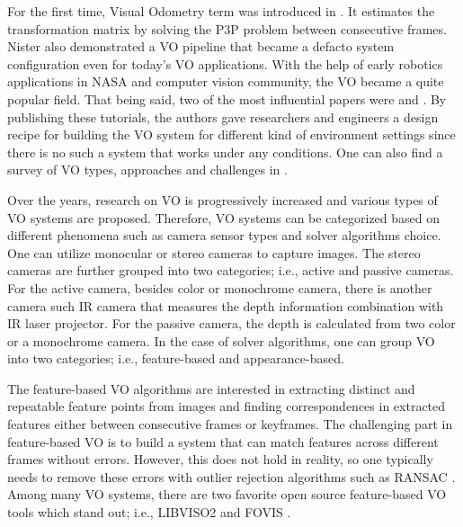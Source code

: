 \documentclass[a4paper]{report}
\numberwithin{figure}{section}
\begin{document}
For the first time, Visual Odometry term was introduced in 
\parencite{Nister2004}. 
It estimates the transformation matrix by solving the P3P problem between 
consecutive frames. Nister also demonstrated a VO pipeline that became a 
defacto system configuration even for today's VO applications. With the help 
of early robotics applications in NASA and computer vision community, the VO 
became a quite popular field. That being said, two of the most influential 
papers were \parencite{Fraundorfer2012} and \parencite{Scaramuzza2011}. By 
publishing 
these tutorials, the authors gave researchers and engineers a design recipe 
for building the VO system for different kind of environment settings since 
there is no such a system that works under any conditions. One can also find a 
survey of VO types, approaches and challenges in \parencite{Aqel2016}.

Over the years, research on VO is progressively increased and various types of 
VO systems are proposed. Therefore, VO systems can be categorized based on 
different phenomena such as camera sensor types and solver algorithms choice. 
One can utilize monocular or stereo cameras to capture images. The stereo 
cameras are further grouped into two categories; i.e., active and passive 
cameras. For the active camera, besides color or monochrome camera, there is 
another camera such IR camera that measures the depth information combination 
with IR laser projector. For the passive camera, the depth is calculated from 
two color or a monochrome camera. In the case of solver algorithms, one can 
group VO into two categories; i.e., feature-based and appearance-based.

The feature-based VO algorithms are interested in extracting distinct and 
repeatable feature points from images and finding correspondences in extracted 
features either between consecutive frames or keyframes. The challenging part 
in feature-based VO is to build a system that can match features across 
different frames without errors. However, this does not hold in reality, so 
one typically needs to remove these errors with outlier rejection algorithms 
such as RANSAC \parencite{Fischler1981b}. Among many VO systems, there are two 
favorite open source feature-based VO tools which stand out; i.e., LIBVISO2 
\parencite{Geiger2011} and FOVIS \parencite{Huanga2011}. 
\end{document}
